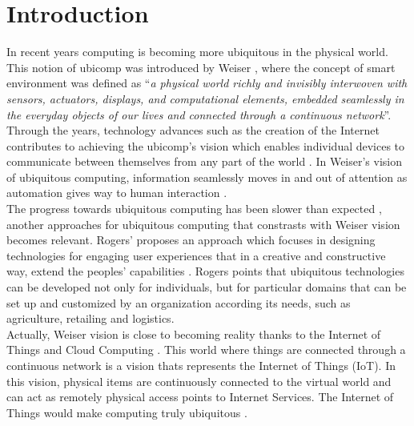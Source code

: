 \section{Introduction}
\label{sec:introduction}
In recent years computing is becoming more ubiquitous in the physical world. This
notion of ubicomp was introduced by Weiser \cite{weiser1999origins}, where the concept of
smart environment was defined as ``\textit{a physical world richly and invisibly
interwoven with sensors, actuators, displays, and computational elements, embedded
seamlessly in the everyday objects of our lives and connected through a continuous network}''.
Through the years, technology advances such as the creation of the Internet contributes
to achieving the ubicomp's vision which enables individual devices to communicate between
themselves from any part of the world \cite{gubbi2013internet}. In Weiser's vision of
ubiquitous computing, information seamlessly moves in and out of attention as automation
gives way to human interaction \cite{weiser1991computer}.\\

The progress towards ubiquitous computing has been slower than expected \cite{greenfield2010everyware},
another approaches for ubiquitous computing that constrasts with Weiser vision becomes relevant.
Rogers' proposes an approach which focuses in designing technologies for engaging user
experiences that in a creative and constructive way, extend the peoples' capabilities \cite{rogers2006moving}.
Rogers points that ubiquitous technologies can be developed not only for individuals,
but for particular domains that can be set up and customized by an organization according
its needs, such as agriculture, retailing and logistics.\\

Actually, Weiser vision is close to becoming reality thanks to the Internet of Things
and Cloud Computing \cite{caceres2012ubicomp}. This world where things are connected
through a continuous network is a vision thats represents the Internet of Things (IoT).
In this vision, physical items are continuously connected to the virtual world and can
act as remotely physical access points to Internet Services. The Internet of Things would
make computing truly ubiquitous \cite{mattern2010internet}.\\

